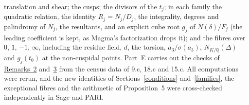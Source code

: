 \documentclass[11pt]{article}
\newcommand{\Q}{\mathbb Q}
\begin{document}
translation and shear; the cusps; the divisors of the \(t_j\); in each family the quadratic relation,
the identity \(R_j=N_j/D_j\), the integrality, degrees and palindromy of \(N_j\), the resultants, and
an explicit cube root \(g_j\) of \(N(\delta)/F_j\) (the leading coefficient is kept, as Magma's
factorization drops it); and the fibres over \(0\), \(1\), \(-1\), \(\infty\), including the residue
field, \(d\), the torsion, \(a_3/\sigma(a_3)\), \(N_{K/\Q}(\Delta)\) and \(g_j(t_0)\) at the non-cuspidal
points. Part~E carries out the checks of \hyperref[rem-both]{Remarks~2} and~\hyperref[rem-census]{3}
from the census data of 9.c, 18.c and 15.c. All computations were rerun, and the new identities of
Sections~\ref{conditions} and~\ref{families}, the exceptional fibres and the arithmetic of
Proposition~5 were cross-checked independently in Sage and PARI.
\end{document}
